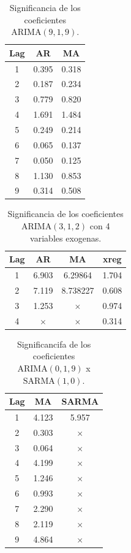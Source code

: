 \documentclass[conference]{IEEEtran}
\begin{document}
\begin{table}
\centering
\caption{Significancia de los coeficientes  $\mathrm{ARIMA}(9,1,9)$.}
\label{tab:sg_arima919}
\begin{tabular}{ccc}
\hline
\textbf{Lag} &\textbf{AR} & \textbf{MA} \\ \hline
 1&0.395  & 0.318 \\
 2&0.187  & 0.234 \\
 3&0.779  & 0.820 \\
 4&1.691  & 1.484 \\
 5&0.249  & 0.214 \\
 6&0.065 & 0.137 \\
 7&0.050 & 0.125 \\
 8&1.130  & 0.853 \\
 9&0.314  & 0.508 \\ \hline
\end{tabular}
\end{table}

\begin{table}
\centering
\caption{Significancia de los coeficientes  $\mathrm{ARIMA}(3,1,2)$ con 4 variables exogenas.}
\label{tab:sg_arima312v4}
\begin{tabular}{cccc}
\hline
\textbf{Lag} &\textbf{AR} & \textbf{MA} & \textbf{xreg} \\
\hline
1 & 6.903 & 6.29864 & 1.704 \\
2 & 7.119 & 8.738227 & 0.608 \\
3 & 1.253 & $\times$  & 0.974 \\
4 &  $\times$ & $\times$ & 0.314 \\ \hline
\end{tabular}
\end{table}

\begin{table}
\centering
\caption{Significancifa de los coeficientes  $\mathrm{ARIMA}(0,1,9)$ x $\mathrm{SARMA(1,0)}$.}
\label{tab:sg_arima019xsar1}
\begin{tabular}{ccc}
\hline
\textbf{Lag} &\textbf{MA} & \textbf{SARMA} \\ \hline
1 & 4.123 &  5.957 \\ 
2 & 0.303 & $\times$\\
3 & 0.064 & $\times$\\
4 & 4.199 & $\times$\\
5 & 1.246 & $\times$\\
6 & 0.993 & $\times$ \\
7 & 2.290 & $\times$\\
8 & 2.119 & $\times$\\
9 & 4.864 & $\times$\\
\hline
\end{tabular}
\end{table}
\end{document}
